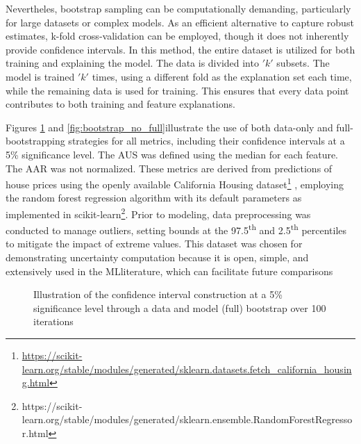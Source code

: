 Nevertheles, bootstrap sampling can be computationally demanding, particularly for large datasets or complex models. As an efficient alternative to capture robust estimates, k-fold cross-validation can be employed, though it does not inherently provide confidence intervals. In this method, the entire dataset is utilized for both training and explaining the model. The data is divided into \('k'\) subsets. The model is trained \('k'\) times, using a different fold as the explanation set each time, while the remaining data is used for training. This ensures that every data point contributes to both training and feature explanations.

Figures \ref{fig:bootstrap_full} and \ref{fig:bootstrap_no_full}illustrate the use of both data-only and full-bootstrapping strategies for all metrics, including their confidence intervals at a 5\% significance level. The \gls{AUS} was defined using the median for each feature. The \gls{AAR} was not normalized. These metrics are derived from predictions of house prices using the openly available California Housing dataset\footnote{\url{https://scikit-learn.org/stable/modules/generated/sklearn.datasets.fetch_california_housing.html}} , employing the random forest regression algorithm with its default parameters as implemented in scikit-learn\footnote{https://scikit-learn.org/stable/modules/generated/sklearn.ensemble.RandomForestRegressor.html}. Prior to modeling, data preprocessing was conducted to manage outliers, setting bounds at the 97.5\textsuperscript{th} and 2.5\textsuperscript{th} percentiles to mitigate the impact of extreme values. This dataset was chosen for demonstrating uncertainty computation because it is open, simple, and extensively used in the \gls{ML}literature, which can facilitate future comparisons


\begin{figure}[ht!]
\centering
  \caption{Illustration of the confidence interval construction at a 5\% significance level through a data and model (full) bootstrap over 100 iterations}
    \label{fig:bootstrap_full}
\end{figure}

